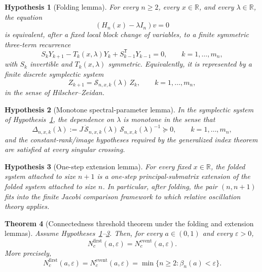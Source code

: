 \documentclass[11pt]{article}
\numberwithin{equation}{section}
\newtheorem{theorem}{Theorem}[section]
\newtheorem{hypothesis}[theorem]{Hypothesis}
\begin{document}
\begin{hypothesis}[Folding lemma]\label{hyp:folding}
For every \(n\ge2\), every \(x\in\mathbb R\), and every \(\lambda\in\mathbb R\), the equation
\[
(H_n(x)-\lambda I_n)v=0
\]
is equivalent, after a fixed local block change of variables, to a finite symmetric three-term
recurrence
\[
S_kY_{k+1}-T_k(x,\lambda)Y_k+S_{k-1}^{\mathsf T}Y_{k-1}=0,
\qquad k=1,\dots,m_n,
\]
with \(S_k\) invertible and \(T_k(x,\lambda)\) symmetric. Equivalently, it is represented by a
finite discrete symplectic system
\[
Z_{k+1}=\mathcal S_{n,x,k}(\lambda)\,Z_k,
\qquad k=1,\dots,m_n,
\]
in the sense of Hilscher--Zeidan.
\end{hypothesis}

\begin{hypothesis}[Monotone spectral-parameter lemma]\label{hyp:monotone}
In the symplectic system of Hypothesis~\ref{hyp:folding}, the dependence on \(\lambda\) is
monotone in the sense that
\[
\Delta_{n,x,k}(\lambda)
:=J\,\dot{\mathcal S}_{n,x,k}(\lambda)\,\mathcal S_{n,x,k}(\lambda)^{-1}
\succeq 0,
\qquad k=1,\dots,m_n,
\]
and the constant-rank/image hypotheses required by the generalized index theorem are satisfied at
every singular crossing.
\end{hypothesis}

\begin{hypothesis}[One-step extension lemma]\label{hyp:extension}
For every fixed \(x\in\mathbb R\), the folded system attached to size \(n+1\) is a one-step
principal-submatrix extension of the folded system attached to size \(n\). In particular, after
folding, the pair \((n,n+1)\) fits into the finite Jacobi comparison framework to which relative
oscillation theory applies.
\end{hypothesis}

\begin{theorem}[Connectedness threshold theorem under the folding and extension lemmas]
\label{thm:conditional-threshold}
Assume Hypotheses~\ref{hyp:folding}--\ref{hyp:extension}. Then, for every
\(a\in(0,1)\) and every \(\varepsilon>0\),
\[
N_c^{\mathrm{first}}(a,\varepsilon)=N_c^{\mathrm{event}}(a,\varepsilon).
\]
More precisely,
\[
N_c^{\mathrm{first}}(a,\varepsilon)
=
N_c^{\mathrm{event}}(a,\varepsilon)
=
\min\{n\ge2:\beta_n(a)<\varepsilon\}.
\]
\end{theorem}
\end{document}
